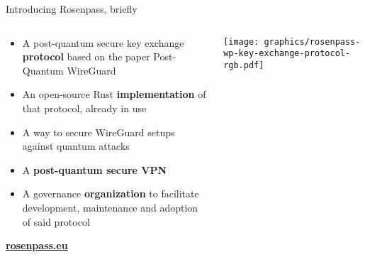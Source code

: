 \begin{frame}{Introducing Rosenpass, briefly}
\hypertarget{rosenpass-introduction}{}
  \begin{columns}[fullwidth,c]

    \begin{column}{.5\linewidth}
      \begin{itemize}
        \item A post-quantum secure key exchange \textbf{protocol}
          {\small based on the paper Post-Quantum WireGuard\citePqwg}
        \item An open-source Rust \textbf{implementation} of that protocol, already in use
        \item A way to secure WireGuard setups against quantum attacks
        \item A \textbf{post-quantum secure VPN}
        \item A governance \textbf{organization} to facilitate development, maintenance and adoption of said protocol
      \end{itemize}
      \vspace{2em}
      \textbf{\href{https://rosenpass.eu}{rosenpass.eu}}
    \end{column}%

    \begin{column}{.5\linewidth}
      \texttt{[image: graphics/rosenpass-wp-key-exchange-protocol-rgb.pdf]}
    \end{column}

  \end{columns}
\end{frame}

